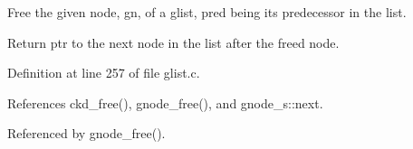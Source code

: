 \-Free the given node, gn, of a glist, pred being its predecessor in the list. 

\-Return ptr to the next node in the list after the freed node. 

\-Definition at line 257 of file glist.\-c.



\-References ckd\-\_\-free(), gnode\-\_\-free(), and gnode\-\_\-s\-::next.



\-Referenced by gnode\-\_\-free().

